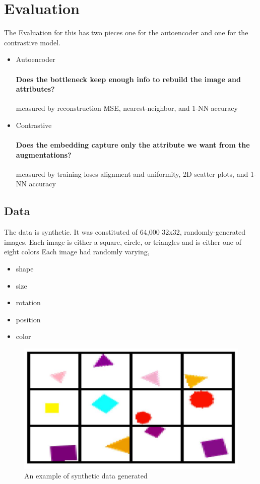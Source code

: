 \documentclass{article}
\begin{document}
\section{Evaluation}
The Evaluation for this has two pieces one for the autoencoder and one for the contrastive model.
\begin{itemize}
    \item Autoencoder
        \paragraph{
        \textbf{Does the bottleneck keep enough info to rebuild the image and attributes?}}measured by reconstruction MSE, nearest-neighbor, and 1-NN accuracy
    \item Contrastive 
        \paragraph{
        \textbf{Does the embedding capture only the attribute we want from the augmentations?}} measured by training loses alignment and uniformity, 2D scatter plots, and 1-NN accuracy
\end{itemize}
\subsection{Data}
The data is synthetic. It was constituted of 64,000 32x32, randomly-generated images. 
Each image is either a square, circle, or triangles and is either one of eight colors
Each image had randomly varying,
\begin{itemize}
    \item shape
    \item size
    \item rotation
    \item position
    \item color
\end{itemize}
\begin{figure}[h]
    \centering
    \includegraphics[scale=0.25]{data_sample}
    \caption{An example of synthetic data generated}
    \label{fig:data_sample}
\end{figure}
\end{document}
